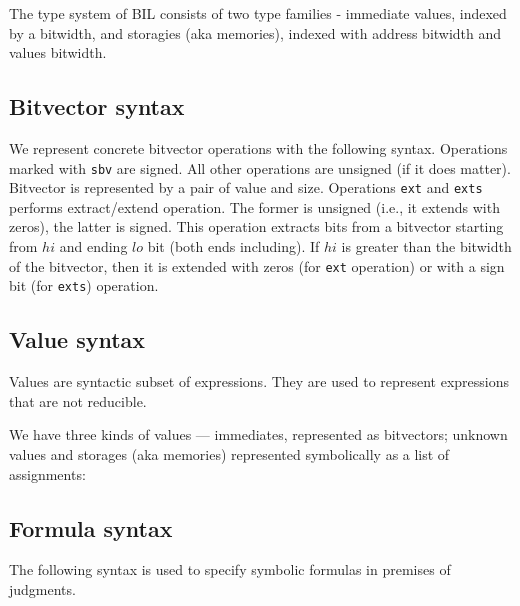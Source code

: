 \documentclass[11pt]{article}
\begin{document}
\ottgrammartabular{
\ottvar\ottinterrule
}

\ottgrammartabular{
\ottbop\ottinterrule
\ottuop\ottinterrule
\ottendian\ottinterrule
\ottcast\ottinterrule
}

The type system of BIL consists of two type families - immediate
values, indexed by a bitwidth, and storagies (aka memories), indexed
with address bitwidth and values bitwidth.

\ottgrammartabular{
\otttype\ottinterrule
}

\subsection{Bitvector syntax}
\label{sec:bitvector}

We represent concrete bitvector operations with the following syntax.
Operations marked with \verb|sbv| are signed. All other operations are
unsigned (if it does matter). Bitvector is represented by a pair of
value and size. Operations \verb|ext| and \verb|exts| performs
extract/extend operation. The former is unsigned (i.e., it extends
with zeros), the latter is signed. This operation extracts bits from a
bitvector starting from $\mathit{hi}$ and ending $\mathit{lo}$ bit
(both ends including). If $\mathit{hi}$ is greater than the bitwidth
of the bitvector, then it is extended with zeros (for \verb|ext|
operation) or with a sign bit (for \verb|exts|) operation.

\ottgrammartabular{
\ottword\ottinterrule
}

\subsection{Value syntax}
\label{sec:values}

Values are syntactic subset of expressions. They are used to represent
expressions that are not reducible.

We have three kinds of values --- immediates, represented as
bitvectors; unknown values and storages (aka memories) represented
symbolically as a list of assignments:

\ottgrammartabular{
\ottval\ottinterrule
}


\subsection{Formula syntax}
\label{sec:formula}

The following syntax is used to specify symbolic formulas in premises
of judgments.
\end{document}
